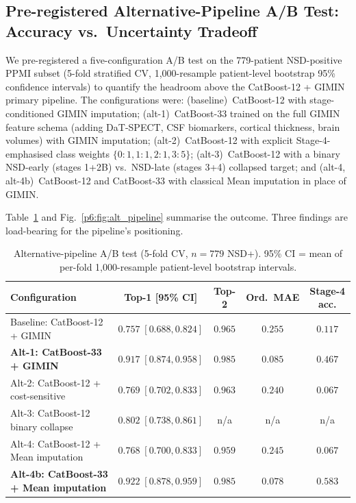 \subsection{Pre-registered Alternative-Pipeline A/B Test: Accuracy vs.\ Uncertainty Tradeoff}
\label{p6:sec:alt_pipeline}

We pre-registered a five-configuration A/B test on the 779-patient NSD-positive PPMI subset (5-fold stratified CV, 1{,}000-resample patient-level bootstrap 95\% confidence intervals) to quantify the headroom above the CatBoost-12 + GIMIN primary pipeline. The configurations were: (baseline)~CatBoost-12 with stage-conditioned GIMIN imputation; (alt-1)~CatBoost-33 trained on the full GIMIN feature schema (adding DaT-SPECT, CSF biomarkers, cortical thickness, brain volumes) with GIMIN imputation; (alt-2)~CatBoost-12 with explicit Stage-4-emphasised class weights $\{0{:}1, 1{:}1, 2{:}1, 3{:}5\}$; (alt-3)~CatBoost-12 with a binary NSD-early (stages 1+2B) vs.\ NSD-late (stages 3+4) collapsed target; and (alt-4, alt-4b)~CatBoost-12 and CatBoost-33 with classical Mean imputation in place of GIMIN.

Table~\ref{p6:tab:alt_pipeline} and Fig.~\ref{p6:fig:alt_pipeline} summarise the outcome. Three findings are load-bearing for the pipeline's positioning.

\begin{table}[!t]
\centering
\caption{Alternative-pipeline A/B test (5-fold CV, $n=779$ NSD+). 95\% CI = mean of per-fold 1{,}000-resample patient-level bootstrap intervals.}
\label{p6:tab:alt_pipeline}
\footnotesize
\setlength{\tabcolsep}{3pt}
\begin{tabular}{@{}lcccc@{}}
\toprule
\textbf{Configuration} & \textbf{Top-1 [95\% CI]} & \textbf{Top-2} & \textbf{Ord.\ MAE} & \textbf{Stage-4 acc.} \\
\midrule
Baseline: CatBoost-12 + GIMIN          & $0.757\;[0.688, 0.824]$ & $0.965$ & $0.255$ & $0.117$ \\
\textbf{Alt-1: CatBoost-33 + GIMIN}    & $\mathbf{0.917\;[0.874, 0.958]}$ & $\mathbf{0.985}$ & $\mathbf{0.085}$ & $\mathbf{0.467}$ \\
Alt-2: CatBoost-12 + cost-sensitive    & $0.769\;[0.702, 0.833]$ & $0.963$ & $0.240$ & $0.067$ \\
Alt-3: CatBoost-12 binary collapse     & $0.802\;[0.738, 0.861]$ & n/a     & n/a     & n/a     \\
Alt-4: CatBoost-12 + Mean imputation   & $0.768\;[0.700, 0.833]$ & $0.959$ & $0.245$ & $0.067$ \\
\textbf{Alt-4b: CatBoost-33 + Mean imputation} & $\mathbf{0.922\;[0.878, 0.959]}$ & $\mathbf{0.985}$ & $\mathbf{0.078}$ & $\mathbf{0.583}$ \\
\bottomrule
\end{tabular}
\end{table}

